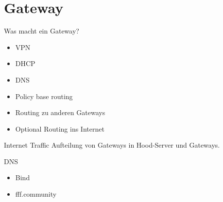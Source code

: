 \section{Gateway}


\begin{frame}{Was macht ein Gateway?}
    \begin{itemize}
        \item VPN
        \item DHCP
        \item DNS
        \item Policy base routing
        \item Routing zu anderen Gateways
        \item Optional Routing ins Internet
    \end{itemize}
\end{frame}

\begin{frame}{Internet Traffic}
    Aufteilung von Gateways in Hood-Server und Gateways.
\end{frame}

\begin{frame}{DNS}
    \begin{itemize}
        \item Bind
        \item fff.community
    \end{itemize}
\end{frame}

